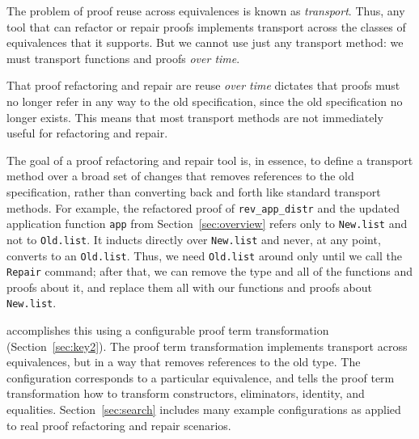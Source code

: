 The problem of proof reuse across equivalences is known as \textit{transport}. %
Thus, any tool that can refactor or repair proofs implements transport across the classes
of equivalences that it supports.
But we cannot use just any transport method: we must transport functions and proofs \textit{over time}.

That proof refactoring and repair are reuse \textit{over time} dictates that proofs
must no longer refer in any way to the old specification, since the old specification no longer exists.
This means that most transport methods %
are not immediately useful for refactoring and repair.

The goal of a proof refactoring and repair tool is, in essence, to
define a transport method over a broad set of changes that
removes references to the old specification, rather than converting back and forth
like standard transport methods.
For example, the refactored proof of \lstinline{rev_app_distr} and the updated application function \lstinline{app}
from Section~\ref{sec:overview} refers only to \lstinline{New.list} and not to \lstinline{Old.list}.
It inducts directly over \lstinline{New.list} and never, at any point, converts to an \lstinline{Old.list}.
Thus, we need \lstinline{Old.list} around only until we call the \lstinline{Repair} command;
after that, we can remove the type and all of the functions and proofs about it, and replace them all with
our functions and proofs about \lstinline{New.list}.

\toolname accomplishes this using a configurable proof term transformation (Section~\ref{sec:key2}).
The proof term transformation implements transport across equivalences, but in a way that removes
references to the old type.
The configuration corresponds to a particular equivalence, and tells the proof term transformation how to transform
constructors, eliminators, identity, and equalities.
Section~\ref{sec:search} includes many example configurations as applied to real proof refactoring and repair scenarios.


